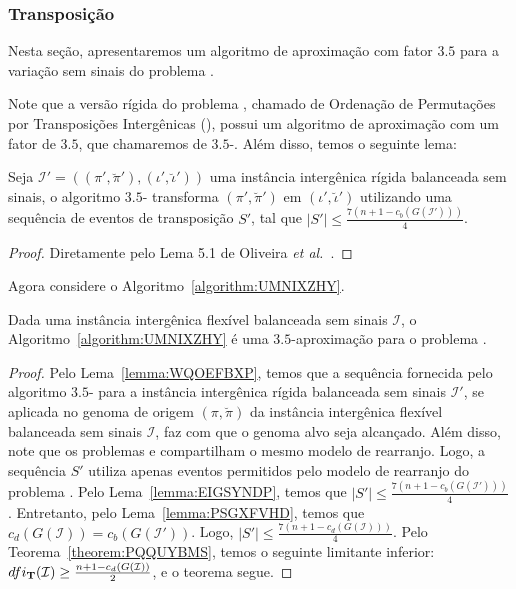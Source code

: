 \subsubsection{Transposição}

Nesta seção, apresentaremos um algoritmo de aproximação com fator $3.5$ para a variação sem sinais do problema \SbFIT{}. 

Note que a versão rígida do problema \SbFIT{}, chamado de Ordenação de Permutações por Transposições Intergênicas (\SbIT), possui um algoritmo de aproximação com um fator de $3.5$, que chamaremos de $3.5$-\SbIT{}. Além disso, temos o seguinte lema:

\begin{lemma}\label{lemma:EIGSYNDP}
Seja $\mathcal{I}' = ((\pi',\breve\pi'),(\iota',\breve\iota'))$ uma instância intergênica rígida balanceada sem sinais, o algoritmo $3.5$-\SbIT{} transforma $(\pi',\breve\pi')$ em $(\iota',\breve\iota')$ utilizando uma sequência de eventos de transposição $S'$, tal que $|S'| \le \frac{7({n+1} - c_b(G(\mathcal{I}')))}{4}$.
\end{lemma}
\begin{proof}
Diretamente pelo Lema 5.1 de Oliveira \textit{et al.}~\cite{2021a-oliveira-etal}.
\end{proof}

Agora considere o Algoritmo~\ref{algorithm:UMNIXZHY}.



\begin{theorem}\label{theorem:PSELGHNY}
Dada uma instância intergênica flexível balanceada sem sinais $\mathcal{I}$, o Algoritmo~\ref{algorithm:UMNIXZHY} é uma $3.5$-aproximação para o problema \SbFIT{}.
\end{theorem}
\begin{proof}
Pelo Lema~\ref{lemma:WQOEFBXP}, temos que a sequência fornecida pelo algoritmo $3.5$-\SbIT{} para a instância intergênica rígida balanceada sem sinais $\mathcal{I'}$, se aplicada no genoma de origem $(\pi,\breve\pi)$ da instância intergênica flexível balanceada sem sinais $\mathcal{I}$, faz com que o genoma alvo seja alcançado. Além disso, note que os problemas \SbIT{} e \SbFIT{} compartilham o mesmo modelo de rearranjo. Logo, a sequência $S'$ utiliza apenas eventos permitidos pelo modelo de rearranjo do problema \SbFIT{}. Pelo Lema~\ref{lemma:EIGSYNDP}, temos que $|S'| \le \frac{7({n+1} - c_b(G(\mathcal{I}')))}{4}$. Entretanto, pelo Lema~\ref{lemma:PSGXFVHD}, temos que $c_d(G(\mathcal{I})) = c_b(G(\mathcal{I}'))$. Logo, $|S'| \le \frac{7({n+1} - c_d(G(\mathcal{I})))}{4}$. Pelo Teorema~\ref{theorem:PQQUYBMS}, temos o seguinte limitante inferior: $dfi_{\textbf{T}}(\mathcal{I}) \ge \frac{{n+1} - c_d(G(\mathcal{I}))}{2}$, e o teorema segue.
\end{proof}

